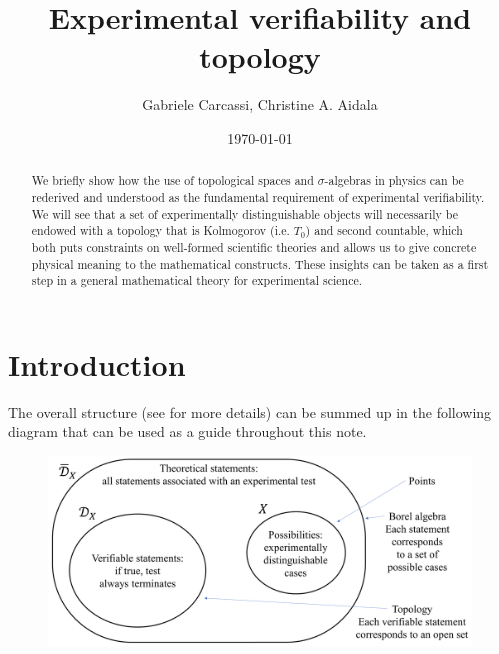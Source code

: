 \documentclass[10pt,twocolumn, nofootinbib]{revtex4-2}
\begin{document}
\title{Experimental verifiability and topology }
\author{Gabriele Carcassi, Christine A. Aidala}

\date{\today}


\begin{abstract}
We briefly show how the use of topological spaces and $\sigma$-algebras in physics can be rederived and understood as the fundamental requirement of experimental verifiability. We will see that a set of experimentally distinguishable objects will necessarily be endowed with a topology that is Kolmogorov (i.e. $T_0$) and second countable, which both puts constraints on well-formed scientific theories and allows us to give concrete physical meaning to the mathematical constructs. These insights can be taken as a first step in a general mathematical theory for experimental science.
\end{abstract}

\maketitle

\section{Introduction}

The overall structure (see \cite{aop-book} for more details) can be summed up in the following diagram that can be used as a guide throughout this note.

\begin{figure}[h]
	\includegraphics[width=\columnwidth]{Diagram.png}
\end{figure}
\end{document}

